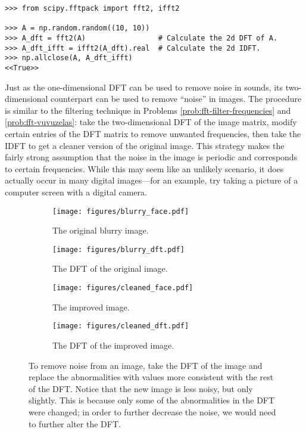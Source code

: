 \begin{lstlisting}
>>> from scipy.fftpack import fft2, ifft2

>>> A = np.random.random((10, 10))
>>> A_dft = fft2(A)                 # Calculate the 2d DFT of A.
>>> A_dft_ifft = ifft2(A_dft).real  # Calculate the 2d IDFT.
>>> np.allclose(A, A_dft_ifft)
<<True>>
\end{lstlisting}

Just as the one-dimensional DFT can be used to remove noise in sounds, its two-dimensional counterpart can be used to remove ``noise'' in images.
The procedure is similar to the filtering technique in Problems \ref{prob:fft-filter-frequencies} and \ref{prob:fft-vuvuzelas}: take the two-dimensional DFT of the image matrix, modify certain entries of the DFT matrix to remove unwanted frequencies, then take the IDFT to get a cleaner version of the original image.
This strategy makes the fairly strong assumption that the noise in the image is periodic and corresponds to certain frequencies.
While this may seem like an unlikely scenario, it does actually occur in many digital images---for an example, try taking a picture of a computer screen with a digital camera.

\begin{figure}
\captionsetup[subfigure]{justification=centering}
\centering
\begin{subfigure}{.4\textwidth}
    \centering
    \texttt{[image: figures/blurry\_face.pdf]}
    \caption{The original blurry image.}
    \label{fig:blurry_face}
\end{subfigure}
\begin{subfigure}{.4\textwidth}
    \centering
    \texttt{[image: figures/blurry\_dft.pdf]}
    \caption{The DFT of the original image.}
    \label{fig:blurry_fft}
\end{subfigure}
\begin{subfigure}{.4\textwidth}
    \centering
    \texttt{[image: figures/cleaned\_face.pdf]}
    \caption{The improved image.}
    \label{fig:improved_face}
\end{subfigure}
\begin{subfigure}{.4\textwidth}
    \centering
    \texttt{[image: figures/cleaned\_dft.pdf]}
    \caption{The DFT of the improved image.}
    \label{fig:covered_fft}
\end{subfigure}
\caption{To remove noise from an image, take the DFT of the image and replace the abnormalities with values more consistent with the rest of the DFT.
Notice that the new image is less noisy, but only slightly.
This is because only some of the abnormalities in the DFT were changed; in order to further decrease the noise, we would need to further alter the DFT.}
\label{fig:image_fft}
\end{figure}

